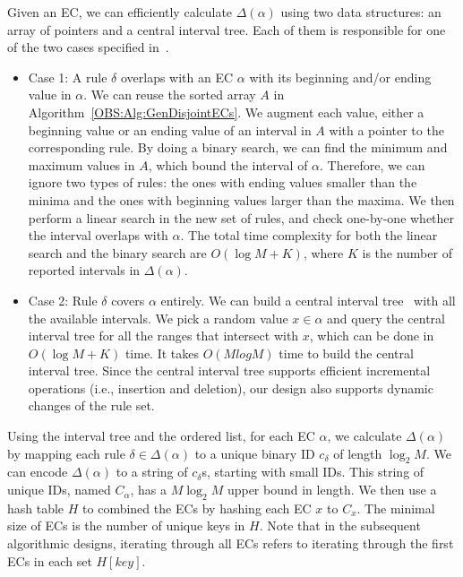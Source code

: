 Given an EC, we can efficiently calculate $\Delta(\alpha)$ using two data structures: an array of pointers and a central interval tree.
Each of them is responsible for one of the two cases specified in~\cite{FindIntersectionWiki}.
\begin{itemize}
    \item Case 1: A rule $\delta$ overlaps with an EC $\alpha$ with its beginning and/or ending value in $\alpha$.
        We can reuse the sorted array $A$ in Algorithm~\ref{OBS:Alg:GenDisjointECs}.
        We augment each value, either a beginning value or an ending value of an interval in $A$ with a pointer to the corresponding rule.
        By doing a binary search, we can find the minimum and maximum values in $A$,
        which bound the interval of $\alpha$.
        Therefore, we can ignore two types of rules: the ones with ending values smaller than the minima and the ones with beginning values larger than the maxima.
        We then perform a linear search in the new set of rules, and check one-by-one whether the interval overlaps with $\alpha$.
        The total time complexity for both the linear search and the binary search are $O(\log M + K)$,
        where $K$ is the number of reported intervals in $\Delta(\alpha)$.

    \item Case 2: Rule $\delta$ covers $\alpha$ entirely. We can build
        a central interval tree~\cite{ComputationalGeometryBook} with all the available intervals.
        We pick a random value $x \in \alpha$ and query the central interval tree for
        all the ranges that intersect with $x$, which can be done in $O(\log M + K)$ time. It takes $O(M log M)$ time to build the central interval tree.
        Since the central interval tree supports efficient incremental operations (i.e., insertion and deletion), our design also supports dynamic changes of the rule set.
\end{itemize}

Using the interval tree and the ordered list, for each EC $\alpha$,
we calculate $\Delta(\alpha)$ by mapping each rule $\delta \in \Delta(\alpha)$ to a unique binary ID $c_\delta$ of length $\log_2 M$.
We can encode $\Delta(\alpha)$ to a string of $c_\delta$s, starting with small IDs.
This string of unique IDs, named $C_\alpha$, has a $M\log_2 M$ upper bound in length.
We then use a hash table $H$ to combined the ECs by hashing each EC $x$ to $C_x$.
The minimal size of ECs is the number of unique keys in $H$.
Note that in the subsequent algorithmic designs, iterating through all ECs refers to iterating through the first ECs in each set $H[key]$.%


